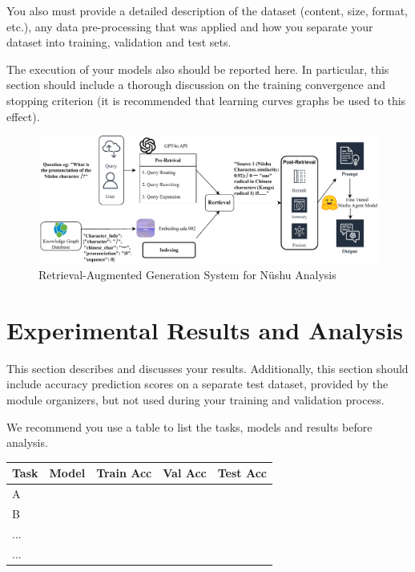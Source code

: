 \documentclass{article}
\begin{document}
    You also must provide a detailed description of the dataset (content, size, format, etc.), any data pre-processing that was applied and how you separate your dataset into training, validation and test sets.
    
    The execution of your models also should be reported here. In particular, this section should include a thorough discussion on the training convergence and stopping criterion (it is recommended that learning curves graphs be used to this effect).

    \begin{figure}[htb]
    \centering
    \includegraphics[width=\textwidth]{images/nvshu_system_rag.drawio.pdf}
    \caption{Retrieval-Augmented Generation System for N\"{u}shu Analysis}
    \label{fig:nvshu_rag_system}
    \end{figure}

\section{Experimental Results and Analysis}
\label{sec:results}
    This section describes and discusses your results. Additionally, this section should include accuracy prediction scores on a separate test dataset, provided by the module organizers, but not used during your training and validation process.
    
    We recommend you use a table to list the tasks, models and results before analysis.
    

    \begin{table}[]
    \label{table:Table1}
    \begin{tabular}{@{}lllll@{}}
    \toprule
    Task & Model & Train Acc & Val Acc & Test Acc \\ \midrule
    A   &       &           &         &          \\
    B   &       &           &         &          \\
    ...   &       &           &         &          \\
    ...   &       &           &         &          \\ \bottomrule
    \end{tabular}
    \end{table}
\end{document}

